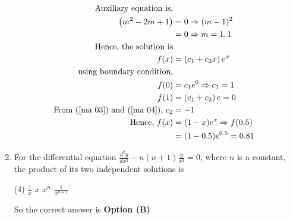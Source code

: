 \begin{enumerate}[label=\color{ocre}\textbf{\arabic*.}]
\begin{answer}
\begin{align}
		\text{Auxiliary equation is,}\notag\\
		\left(m^{2}-2 m+1\right)&=0 \Rightarrow(m-1)^{2}\notag\\&=0 \Rightarrow m=1,1\notag\\
		\text{Hence, the solution is}\notag\\
		f(x)&=\left(c_{1}+c_{2} x\right) e^{x}\notag\\
		\text{using boundary condition,}\notag\\
		f(0)&=c_{1} e^{0} \Rightarrow c_{1}=1 \label{ma 03}\\
		f(1)&=\left(c_{1}+c_{2}\right) e=0 \label{ma 04}\\
		\text{	From (\ref{ma 03}) and (\ref{ma 04}), }c_{2}&=-1 \label{ma 05}\notag\\
		\text{Hence, }f(x)&=(1-x) e^{x} \Rightarrow f(0.5)\notag\\&=(1-0.5) e^{0.5}=0.81\notag
		\end{align}
	\end{answer}
	\item  For the differential equation $\frac{d^{2} y}{d x^{2}}-n(n+1) \frac{y}{x^{2}}=0$, where $n$ is a constant, the product of
	its two independent solutions is
	{}
	\begin{tasks}(4)
		\task[\textbf{A.}] $\frac{1}{x}$
		\task[\textbf{B.}] $x$
		\task[\textbf{C.}] $x^{n}$
		\task[\textbf{D.}] $\frac{1}{x^{n+1}}$
	\end{tasks}
	\begin{answer}
		So the correct answer is \textbf{Option (B)}
	\end{answer}
\end{enumerate}